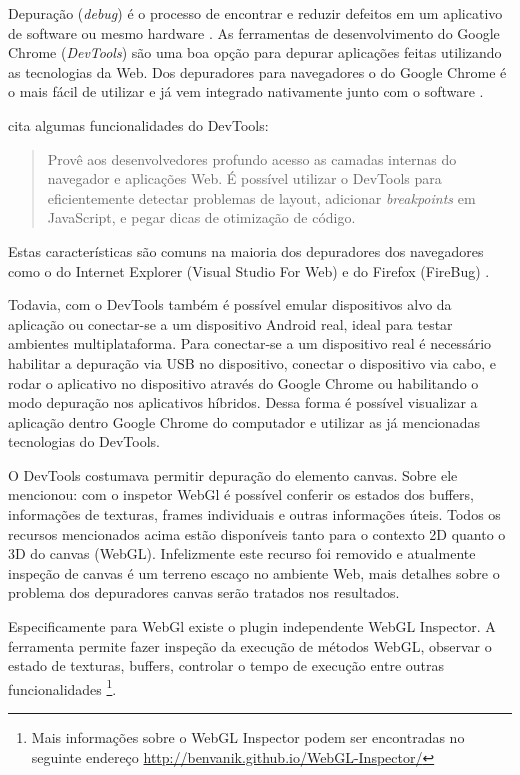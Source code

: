 Depuração (\textit{debug}) é o processo de encontrar e
reduzir defeitos em um aplicativo de software ou mesmo hardware
\autocite{depuracao}. As ferramentas de desenvolvimento do Google Chrome
(\textit{DevTools}) são uma boa opção para depurar aplicações
feitas utilizando as tecnologias da Web. Dos depuradores para
navegadores o do Google Chrome é o mais fácil de utilizar e já vem
integrado nativamente junto com o software \autocite{gamesDebug}.

\noindent \citet{chromeDevTools} cita algumas funcionalidades do DevTools:
\begin{quote}
Provê aos desenvolvedores profundo acesso as camadas internas do
navegador e aplicações Web. É possível utilizar o DevTools
para eficientemente detectar problemas de layout, adicionar
\textit{breakpoints} em JavaScript, e pegar dicas de otimização de
código.
\end{quote}

Estas características são comuns na maioria dos depuradores dos
navegadores como o do Internet Explorer (Visual Studio For Web) e do
Firefox (FireBug) \autocite{gamesDebug}.

Todavia, com o DevTools também é possível emular dispositivos alvo da
aplicação ou conectar-se a um dispositivo Android real, ideal para
testar ambientes multiplataforma. Para conectar-se a um dispositivo real
é necessário habilitar a depuração via USB no dispositivo, conectar
o dispositivo via cabo, e rodar o aplicativo no dispositivo através
do Google Chrome ou habilitando o modo depuração nos aplicativos
híbridos. Dessa forma é possível visualizar a aplicação dentro
Google Chrome do computador e utilizar as já mencionadas tecnologias do
DevTools.

O DevTools costumava permitir depuração do elemento canvas.
Sobre ele \citet{html5mostwanted} mencionou: com o inspetor WebGl é possível
conferir os estados dos buffers, informações de texturas, frames
individuais e outras informações úteis. Todos os recursos mencionados
acima estão disponíveis tanto para o contexto 2D quanto o 3D do canvas
(WebGL). Infelizmente este recurso foi removido e atualmente inspeção 
de canvas é um terreno escaço no ambiente Web, mais detalhes sobre
o problema dos depuradores canvas serão tratados nos resultados.

Especificamente para WebGl existe o plugin independente WebGL Inspector.
A ferramenta permite fazer inspeção da execução de métodos
WebGL, observar o estado de texturas, buffers, controlar o tempo de
execução entre outras funcionalidades \footnote{Mais informações
sobre o WebGL Inspector podem ser encontradas no seguinte endereço
\url{http://benvanik.github.io/WebGL-Inspector/}}.

